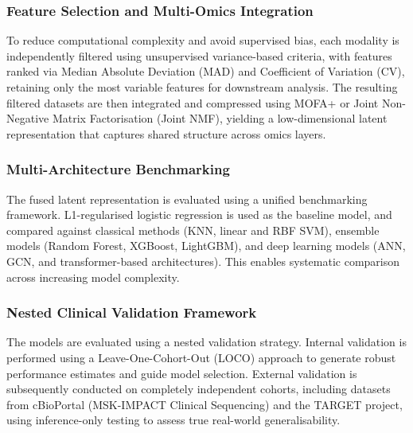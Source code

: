 \documentclass[conference]{IEEEtran}
\begin{document}
\subsubsection{Feature Selection and Multi-Omics Integration} To reduce computational complexity and avoid supervised bias, each modality is independently filtered using unsupervised variance-based criteria, with features ranked via Median Absolute Deviation (MAD) and Coefficient of Variation (CV), retaining only the most variable features for downstream analysis. The resulting filtered datasets are then integrated and compressed using MOFA+ or Joint Non-Negative Matrix Factorisation (Joint NMF), yielding a low-dimensional latent representation that captures shared structure across omics layers.
\subsubsection{Multi-Architecture Benchmarking} The fused latent representation is evaluated using a unified benchmarking framework. L1-regularised logistic regression is used as the baseline model, and compared against classical methods (KNN, linear and RBF SVM), ensemble models (Random Forest, XGBoost, LightGBM), and deep learning models (ANN, GCN, and transformer-based architectures). This enables systematic comparison across increasing model complexity.
\subsubsection{Nested Clinical Validation Framework} The models are evaluated using a nested validation strategy. Internal validation is performed using a Leave-One-Cohort-Out (LOCO) approach to generate robust performance estimates and guide model selection. External validation is subsequently conducted on completely independent cohorts, including datasets from cBioPortal (MSK-IMPACT Clinical Sequencing) and the TARGET project, using inference-only testing to assess true real-world generalisability.
\end{document}
